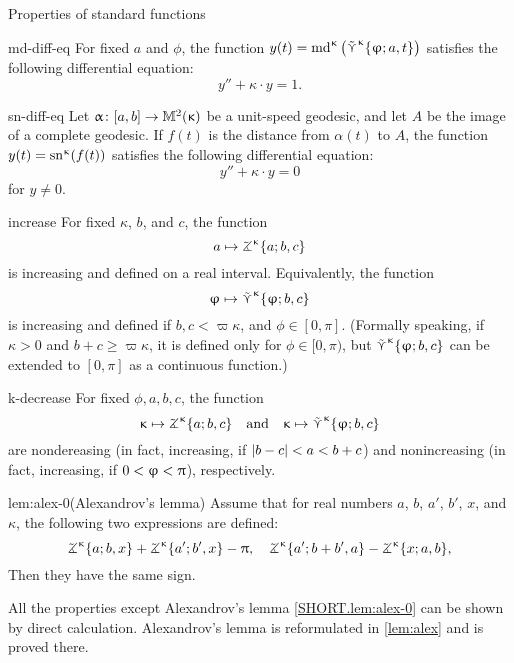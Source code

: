 \begin{thm}{Properties of standard functions}\label{md-equalities}

\begin{subthm}{md-diff-eq}
For fixed $a$ and $\phi$, the function $y(t)=\mathrm{md}^{\upkappa}\left(\mathop{\tilde\curlyvee}\nolimits^{\upkappa}\{\upvarphi;a,t\}\right)$
 satisfies the following differential equation:
\[y''+\kappa\cdot y=1.\]
\end{subthm}

\begin{subthm}{sn-diff-eq}
Let $\alpha\:[a,b]\to\Lob2\kappa$ be a unit-speed geodesic, and let $A$ be the image of a complete geodesic. If $f(t)$ is the distance from $\alpha(t)$ to $A$, the function 
$y(t)=\mathrm{sn}^{\upkappa} (f(t))$
 satisfies the following differential equation:
\[y''+\kappa\cdot y=0\]
for $y\ne 0$.
\end{subthm}

\begin{subthm}{increase}
For fixed $\kappa$, $b$, and $c$, the function 
\[a\mapsto\tangle\mc\kappa\{a;b,c\}\]
is increasing and defined on a real interval.
Equivalently, the function
\[\phi\mapsto\side\kappa \{\phi;b,c\}\]
is increasing and defined if $b,c<\varpi\kappa$, and $\phi\in[0,\pi]$.
(Formally speaking, if $\kappa>0$ and $b+c\ge \varpi\kappa$, it is defined only for $\phi\in[0,\pi)$, but $\mathop{\tilde\curlyvee}\nolimits^{\upkappa} \{\upvarphi;b,c\}$ can be extended to $[0,\pi]$ as a continuous function.)
\end{subthm}

\begin{subthm}{k-decrease}
For fixed $\phi,a,b,c$, the function
\[\kappa\mapsto \tangle\mc\kappa\{a;b,c\}\quad \text{and}\quad \kappa\mapsto \side\kappa \{\phi;b,c\}\]
are nondereasing (in fact, increasing, if $|b\z-c|\z<a\z< b+c$)
and nonincreasing (in fact, increasing, if $0\z<\phi\z<\pi$), respectively.
\end{subthm}

\begin{subthm}{lem:alex-0}(Alexandrov's lemma)
Assume that for real numbers $a$, $b$, $a'$, $b'$, $x$, and $\kappa$, the following two expressions are defined:
\[\tangle\mc\kappa\{a;b,x\}+\tangle\mc\kappa\{a';b',x\}-\pi,\quad
\tangle\mc\kappa\{a';b+b',a\}-\tangle\mc\kappa\{x;a,b\},\]
Then they have the same sign.
\end{subthm}
\end{thm}

All the properties except Alexandrov's lemma \ref{SHORT.lem:alex-0} can be shown by direct calculation. Alexandrov's lemma is reformulated in \ref{lem:alex} and is proved there.

